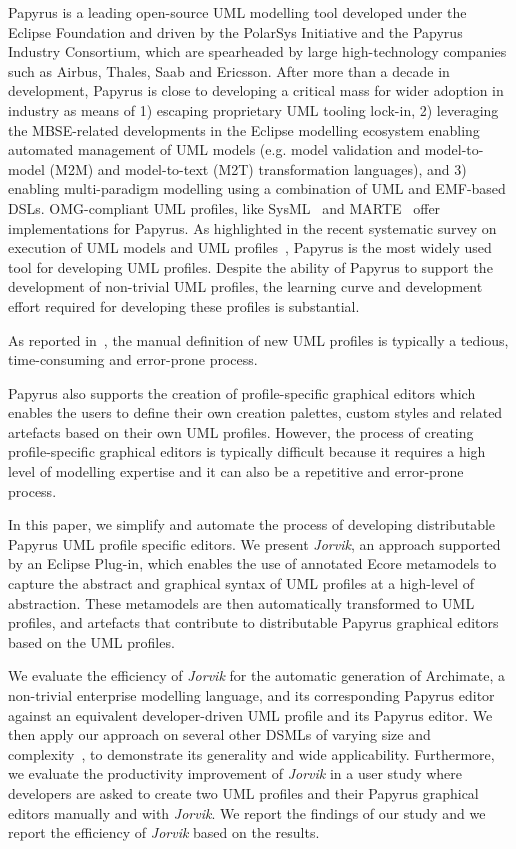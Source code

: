 Papyrus \cite{lanusse2009papyrus} is a leading open-source UML modelling tool developed under the Eclipse Foundation and driven by the PolarSys Initiative and the Papyrus Industry Consortium, which are spearheaded by large high-technology companies such as Airbus, Thales, Saab and Ericsson. 
After more than a decade in development, Papyrus is close to developing a critical mass for wider adoption in industry as means of 1) escaping proprietary UML tooling lock-in, 2) leveraging the MBSE-related developments in the Eclipse modelling ecosystem enabling automated management of UML models (e.g. model validation and model-to-model (M2M) and model-to-text (M2T) transformation languages), and 3) enabling multi-paradigm modelling using a combination of UML and EMF-based DSLs. 
OMG-compliant UML profiles, like SysML~\cite{friedenthal2014practical} and MARTE~\cite{omg2011marte} offer implementations for Papyrus. 
As highlighted in the recent systematic survey on execution of UML models and UML profiles~\cite{ciccozzi2018execution}, Papyrus is the most widely used tool for developing UML profiles. 
Despite the ability of Papyrus to support the development of non-trivial UML profiles, the learning curve and development effort required for developing these profiles is substantial.

As reported in~\cite{Wimmer2009:IJWIS}, the manual definition of new UML profiles is typically a tedious, time-consuming and error-prone process.

Papyrus also supports the creation of profile-specific graphical editors which enables the users to define their own creation palettes, custom styles and related artefacts based on their own UML profiles. 
However, the process of creating profile-specific graphical editors is typically difficult because it requires a high level of modelling expertise and it can also be a repetitive and error-prone process.

In this paper, we simplify and automate the process of developing distributable Papyrus UML profile specific editors. 
We present \textit{Jorvik}, an approach supported by an Eclipse Plug-in, which enables the use of annotated Ecore metamodels to capture the abstract and graphical syntax of UML profiles at a high-level of abstraction. These metamodels are then automatically transformed to UML profiles, and artefacts that contribute to distributable Papyrus graphical editors based on the UML profiles. 


We evaluate the efficiency of \textit{Jorvik} for the automatic generation of Archimate, a non-trivial enterprise modelling language, and its corresponding Papyrus editor against an equivalent developer-driven UML profile and its Papyrus editor. 
We then apply our approach on several other DSMLs of varying size and complexity~\cite{williams2013metamodels}, to demonstrate its generality and wide applicability. 
Furthermore, we evaluate the productivity improvement of \textit{Jorvik} in a user study where developers are asked to create two UML profiles and their Papyrus graphical editors manually and with \textit{Jorvik}.
We report the findings of our study and we report the efficiency of \textit{Jorvik} based on the results. 

